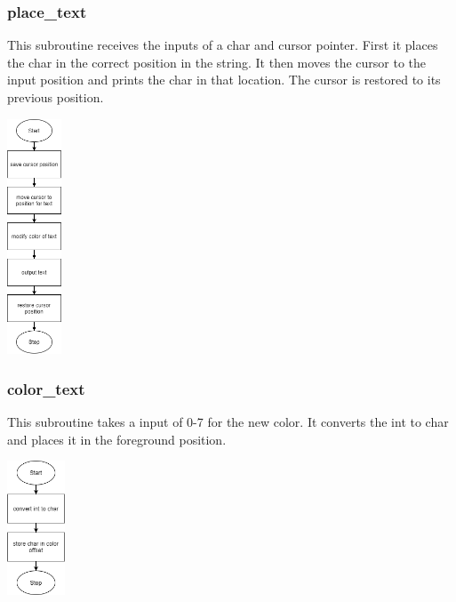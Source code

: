 \documentclass{article}
\begin{document}
    \subsubsection{place\_text}
        This subroutine receives the inputs of a char and cursor pointer.
        First it places the char in the correct position in the string.
        It then moves the cursor to the input position and prints the char
        in that location.  The cursor is restored to its previous position.
        \begin{center}
            {\includegraphics[height=7cm]{place_text.png}\centering} 
        \end{center}
    
    \subsubsection{color\_text}
        This subroutine takes a input of 0-7 for the new color.
        It converts the int to char and places it in the foreground 
        position.
        \begin{center}
            {\includegraphics[height=4cm]{color_text.png}\centering} 
        \end{center}
        \newpage
\end{document}
